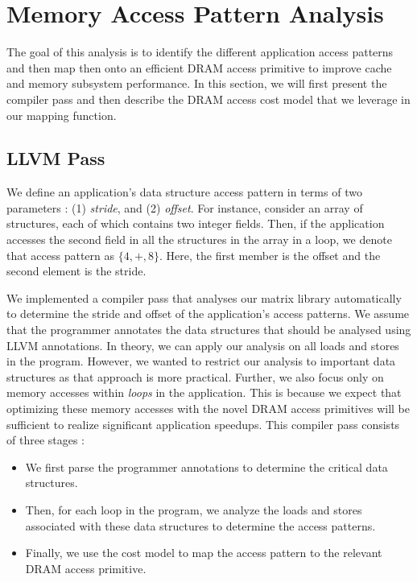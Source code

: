 \documentclass[letterpaper]{article}
\begin{document}
\section{Memory Access Pattern Analysis}

The goal of this analysis is to identify the different application access
patterns and then map then onto an efficient DRAM access primitive to improve
cache and memory subsystem performance. In this section, we will first present
the compiler pass and then describe the DRAM access cost model that we leverage
in our mapping function.

\subsection{LLVM Pass}

We define an application's data structure access pattern in terms of two 
parameters : (1) \textit{stride}, and (2) \textit{offset}. 
For instance, consider an array of structures, each of which contains two
integer fields. 
Then, if the application accesses the second field in all the structures 
in the array in a loop, we denote that access pattern as $\{4,+,8\}$. 
Here, the first member is the offset and the second element is the stride.

We implemented a compiler pass that analyses our matrix library automatically
to determine the stride and offset of the application's access patterns.
We assume that the programmer annotates the data structures that should
be analysed using LLVM annotations.
In theory, we can apply our analysis on all loads and stores in the program.
However, we wanted to restrict our analysis to important data structures
as that approach is more practical.
Further, we also focus only on memory accesses within \textit{loops} in the 
application. This is because we expect that optimizing these memory accesses
with the novel DRAM access primitives will be sufficient to realize
significant application speedups.
This compiler pass consists of three stages :

\begin{itemize}
  \item{We first parse the programmer annotations to determine the critical data
  structures.}
  \item{Then, for each loop in the program, we analyze the loads and
  stores associated with these data structures to determine the access
  patterns.}
  \item{Finally, we use the cost model to map the access pattern to the
  relevant DRAM access primitive.}
\end{itemize}
\end{document}
